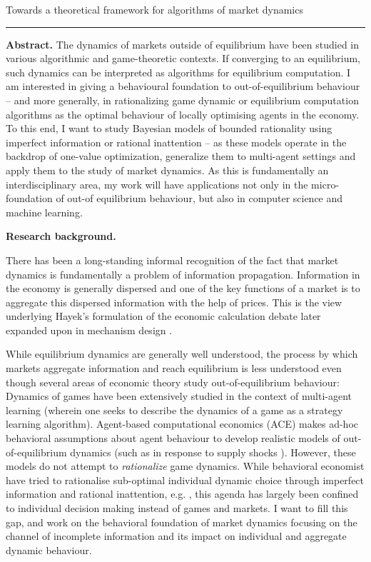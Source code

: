\documentclass{article}
\newcommand{\soptitle}{Towards a theoretical framework for algorithms of market dynamics}
\newcommand{\statement}[1]{\par\medskip
  {\textbf{#1.}}\space
}
\begin{document}
\begin{center}
\LARGE\soptitle%
\end{center}

\hrule

\bigskip

\par\medskip

\statement{Abstract} The dynamics of markets outside of equilibrium have been studied in various algorithmic and game-theoretic contexts. If converging to an equilibrium, such dynamics can be interpreted as algorithms for equilibrium computation. I am interested in giving a behavioural foundation to out-of-equilibrium behaviour -- and more generally, in rationalizing game dynamic or equilibrium computation algorithms as the optimal behaviour of locally optimising agents in the economy. To this end, I want to study Bayesian models of bounded rationality using imperfect information or rational inattention -- as these models operate in the backdrop of one-value optimization, generalize them to multi-agent settings and apply them to the study of market dynamics. As this is fundamentally an interdisciplinary area, my work will have applications not only in the micro-foundation of out-of equilibrium behaviour, but also in computer science and machine learning.

\statement{Research background} 

There has been a long-standing informal recognition of the fact that market dynamics is fundamentally a problem of information propagation. Information in the economy is generally dispersed and one of the key functions of a market is to aggregate this dispersed information with the help of prices. This is the view underlying Hayek’s formulation of the economic calculation debate \cite{hayek} later expanded upon in mechanism design \cite{palda}. 

While equilibrium dynamics are generally well understood, the process by which markets aggregate information and reach equilibrium is less understood even though several areas of economic theory study out-of-equilibrium behaviour: Dynamics of games have been extensively studied in the context of multi-agent learning \cite{fudenberg} (wherein one seeks to describe the dynamics of a game as a strategy learning algorithm). Agent-based computational economics (ACE) \cite{hce:32} makes ad-hoc behavioral assumptions about agent behaviour to develop realistic models of out-of-equilibrium dynamics (such as in response to supply shocks \cite{gas, hal1, hal2}). However, these models do not attempt to \emph{rationalize} game dynamics. While behavioral economist have tried to rationalise sub-optimal individual dynamic choice through imperfect information and rational inattention, e.g. \cite{gabaix, laibson}, this agenda has largely been confined to individual decision making instead of games and markets. I want to fill this gap, and work on the behavioral foundation of market dynamics focusing on the channel of incomplete information and its impact on individual and aggregate dynamic behaviour. 
\end{document}
